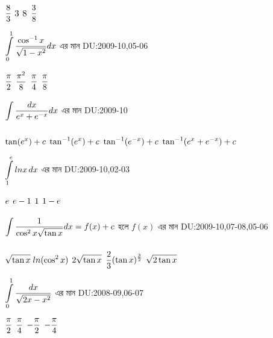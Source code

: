 \documentclass[addpoints]{exam}
\begin{document}
\begin{questions}
\begin{oneparchoices}
 \choice $\mathlarger{\frac{8}{3}}$
 \choice $\mathlarger{3}$
 \choice $\mathlarger{8}$
 \choice $\mathlarger{\frac{3}{8}}$
\end{oneparchoices}

\question  $\mathlarger{\int\limits_{0}^{1} \frac{\cos ^{-1}x}{\sqrt{1-x^2}}} dx$  এর মান \hfill \textsc{DU:2009-10,05-06}

\begin{oneparchoices}
 \choice $\mathlarger{\frac{\pi}{2}}$
 \choice $\mathlarger{\frac{\pi^{2}}{8}}$
 \choice $\mathlarger{\frac{\pi }{4}}$
 \choice $\mathlarger{\frac{\pi }{8}}$
\end{oneparchoices}

\question  $\mathlarger{\int\limits_{}^{} \frac{dx}{e^{x}+e^{-x}}dx}$ এর মান   \hfill \textsc{DU:2009-10}

\begin{oneparchoices}
 \choice $\mathlarger{\tan (e^x) +c}$
 \choice $\mathlarger{\tan ^{-1}(e^x) +c}$
\choice $\mathlarger{\tan ^{-1}(e^{-x}) +c}$
\choice $\mathlarger{\tan ^{-1}(e^{x}+e^{-x}) +c}$
\end{oneparchoices}

\question   $\mathlarger{\int\limits_{1}^{e} lnx\,dx}$ এর মান \hfill \textsc{DU:2009-10,02-03}

\begin{oneparchoices}
 \choice $\mathlarger{e}$
 \choice $\mathlarger{e-1}$
\choice $\mathlarger{1}$
\choice $\mathlarger{1-e}$
\end{oneparchoices}

\question  $\mathlarger{\int\limits_{}^{} \frac{1}{\cos^{2}x\sqrt{\tan x}}dx = f(x)+c}$ হলে $f(x)$ এর মান   \hfill \textsc{DU:2009-10,07-08,05-06}

\begin{oneparchoices}

\choice $\mathlarger{\sqrt{\tan x} \;ln(\cos ^2 x)}$
 \choice $\mathlarger{2 \sqrt{\tan x}}$
\choice $\mathlarger{\frac{2}{3}(\tan x)^{\frac{3}{2}} }$
\choice $\mathlarger{\sqrt{2\tan x} }$

\end{oneparchoices}

\question   $\mathlarger{\int\limits_{0}^{1} \frac{dx}{\sqrt{2x-x^2}}}$ এর মান \hfill \textsc{DU:2008-09,06-07}

\begin{oneparchoices}
 \choice $\mathlarger{\frac{\pi}{2}}$
 \choice $\mathlarger{\frac{\pi}{4}}$
\choice $\mathlarger{-\frac{\pi}{2}}$
\choice $\mathlarger{-\frac{\pi}{4}}$
\end{oneparchoices}


\end{questions}
\end{document}
